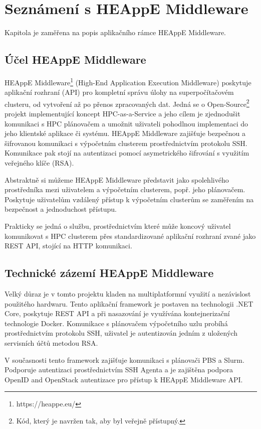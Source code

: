 \chapter{Seznámení s HEAppE Middleware}\label{chapter:chapter-about-heappe-middleware}
Kapitola je zaměřena na popis aplikačního rámce HEAppE Middleware.

\section{Účel HEAppE Middleware}
HEAppE Middleware\footnote{https://heappe.eu/} (High-End Application Execution Middleware) poskytuje aplikační rozhraní (API) pro kompletní správu úlohy na superpočítačovém clusteru, od vytvoření až po přenos zpracovaných dat. Jedná se o Open-Source\footnote{Kód, který je navržen tak, aby byl veřejně přístupný.} projekt implementující koncept HPC-as-a-Service a jeho cílem je zjednodušit komunikaci s HPC plánovačem a umožnit uživateli pohodlnou implementaci do jeho klientské aplikace či systému. HEAppE Middleware zajišťuje bezpečnou a šifrovanou komunikaci s výpočetním clusterem prostřednictvím protokolu SSH. Komunikace pak stojí na autentizaci pomocí asymetrického šifrování s využitím veřejného klíče (RSA).

Abstraktně si můžeme HEAppE Middleware představit jako spolehlivého prostředníka mezi uživatelem a výpočetním clusterem, popř. jeho plánovačem. Poskytuje uživatelům vzdálený přístup k výpočetním clusterům se zaměřením na bezpečnost a jednoduchost přístupu.

Prakticky se jedná o službu, prostřednictvím které může koncový uživatel komunikovat s HPC clusterem přes standardizované aplikační rozhraní zvané jako REST API, stojící na HTTP komunikaci.


\section{Technické zázemí HEAppE Middleware}
Velký důraz je v tomto projektu kladen na multiplatformní využití a nezávislost použitého hardwaru. Tento aplikační framework je postaven na technologii .NET Core, poskytuje REST API a při nasazování je využívána kontejnerizační technologie Docker. Komunikace s plánovačem výpočetního uzlu probíhá prostřednictvím protokolu SSH, uživatel je autentizován jedním z uložených servisních účtů metodou RSA.

V současnosti tento framework zajišťuje komunikaci s plánovači PBS a Slurm. Podporuje autentizaci prostřednictvím SSH Agenta a je zajištěna podpora OpenID and OpenStack autentizace pro přístup k HEAppE Middleware API.

